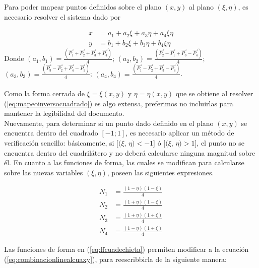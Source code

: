 Para poder mapear puntos definidos sobre el plano $(x,y)$ al plano $(\xi, \eta)$, es necesario resolver el sistema dado por 

\begin{equation}
  \label{eq:mapeoinversocuadrado}
  \begin{split}
    x & = a_1 + a_2\xi + a_3\eta + a_4\xi\eta \\
    y & = b_1 + b_2\xi + b_3\eta + b_4\xi\eta
  \end{split}
\end{equation}
Donde $(a_1, b_1)= \frac{(\vec{P_1} + \vec{P_2} + \vec{P_3} +
  \vec{P_4})}{4}$; $(a_2, b_2)=  \frac{(\vec{P_2} - \vec{P_1} + \vec{P_3} -
  \vec{P_4})}{4}$; $(a_3, b_3)= \frac{(\vec{P_3} - \vec{P_2} + \vec{P_4} -
  \vec{P_1})}{4} $; $(a_4, b_4)= \frac{(\vec{P_1} - \vec{P_2} + \vec{P_3} - \vec{P_4})}{4}$. \\ \\
Como la forma cerrada de $\xi= \xi(x,y)$ y $\eta= \eta(x,y)$ que se obtiene al resolver (\ref{eq:mapeoinversocuadrado}) es algo extensa, preferimos no incluirlas para mantener la legibilidad del documento. \\
Nuevamente, para determinar si un punto dado definido en el plano $(x,y)$ se encuentra dentro del cuadrado $[-1; 1]$, es necesario aplicar un método de verificación sencillo: básicamente, si [$(\xi$, $\eta) <  -1$] ó [$(\xi$, $\eta) >  1  $], el punto no se encuentra dentro del cuadrilátero y no deberá calcularse ninguna magnitud sobre él. En cuanto a las funciones de forma, las cuales se modifican para calcularse sobre las nuevas variables $(\xi, \eta)$, poseen las siguientes expresiones.

\begin{equation}
  \label{eq:ffcuadechieta}
  \begin{split}
    N_1 & = \frac{ (1-\eta)(1-\xi) }{4} \\
    N_2 & = \frac{ (1+\eta)(1-\xi) }{4} \\
    N_3 & = \frac{ (1+\eta)(1+\xi) }{4} \\
    N_4 & = \frac{ (1-\eta)(1+\xi) }{4} 
  \end{split}
\end{equation}

Las funciones de forma en (\ref{eq:ffcuadechieta}) permiten modificar a la ecuación (\ref{eq:combinacionlinealcuaxy}), para reescribbirla de la siguiente manera:

